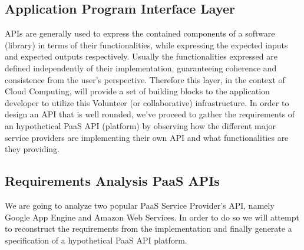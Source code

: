 \documentclass[11pt]{amsart}
\begin{document}
\begin{enumarate}
          \section{Application Program Interface Layer}
          APIs are generally used to express the contained components of a software
          (library) in terms of their functionalities, while expressing the expected
          inputs and expected outputs respectively. Usually the functionalities expressed
          are defined independently of their implementation, guaranteeing coherence and
          consistence from the user's perspective. Therefore this layer, in the context of
          Cloud Computing, will provide a set of building blocks to the application
          developer to utilize this Volunteer (or collaborative) infrastructure. In order
          to design an API that is well rounded, we've proceed to gather the requirements of
          an hypothetical PaaS API (platform) by observing how the different major service providers are
          implementing their own API and what functionalities are they providing. 
          
          \subsection{Requirements Analysis PaaS APIs}
          We are going to analyze two popular PaaS Service Provider's API, namely
          Google App Engine and Amazon Web Services. In order to do so we will attempt to
          reconstruct the requirements from the implementation and finally generate a
          specification of a hypothetical PaaS API platform. 


\end{enumarate}
\end{document}
